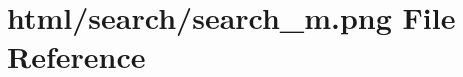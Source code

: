 \hypertarget{search__m_8png}{}\section{html/search/search\+\_\+m.png File Reference}
\label{search__m_8png}
